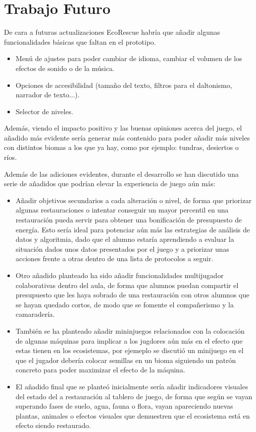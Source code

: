 \section{Trabajo Futuro}

De cara a futuras actualizaciones EcoRescue habría que añadir algunas funcionalidades básicas que faltan en el prototipo. 
\begin{itemize}
    \item Menú de ajustes para poder cambiar de idioma, cambiar el volumen de los efectos de sonido o de la música.
    \item Opciones de accesibilidad (tamaño del texto, filtros para el daltonismo, narrador de texto...).
    \item Selector de niveles.
\end{itemize}

Además, viendo el impacto positivo y las buenas opiniones acerca del juego, el añadido más evidente sería generar más contenido para poder añadir más niveles con distintos biomas a los que ya hay, como por ejemplo: tundras, desiertos o ríos.

Además de las adiciones evidentes, durante el desarrollo se han discutido una serie de añadidos que podrían elevar la experiencia de juego aún más:
\begin{itemize}
    \item Añadir objetivos secundarios a cada alteración o nivel, de forma que priorizar algunas restauraciones o intentar conseguir un mayor percentil en una restauración pueda servir para obtener una bonificación de presupuesto de energía. Esto sería ideal para potenciar aún más las estrategias de análisis de datos y algoritmia, dado que el alumno estaría aprendiendo a evaluar la situación dados unos datos presentados por el juego y a priorizar unas acciones frente a otras dentro de una lista de protocolos a seguir.
    \item Otro añadido planteado ha sido añadir funcionalidades multijugador colaborativas dentro del aula, de forma que alumnos puedan compartir el presupuesto que les haya sobrado de una restauración con otros alumnos que se hayan quedado cortos, de modo que se fomente el compañerismo y la camaradería.
    \item También se ha planteado añadir mininjuegos relacionados con la colocación de algunas máquinas para implicar a los jugdores aún más en el efecto que estas tienen en los ecosistemas, por ejemeplo se discutió un minijuego en el que el jugador debería colocar semillas en un bioma siguiendo un patrón concreto para poder maximizar el efecto de la máquina. 
    \item El añadido final que se planteó inicialmente sería añadir indicadores visuales del estado del a restauración al tablero de juego, de forma que según se vayan superando fases de suelo, agua, fauna o flora, vayan apareciendo nuevas plantas, animales o efectos visuales que demuestren que el ecosistema está en efecto siendo restaurado. 
\end{itemize}

